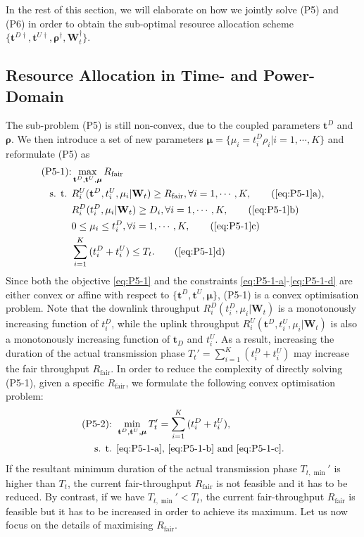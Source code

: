 \documentclass[12pt,draft,onecolumn,journal]{IEEEtran}
\begin{document}
In the rest of this section, we will elaborate on how we jointly solve (P5) and (P6) in order to obtain the sub-optimal resource allocation scheme $\{\mathbf{t}^{D\dagger}, \mathbf{t}^{U\dagger}, \boldsymbol{\rho}^\dagger, \mathbf{W}_t^\dagger\}$.


\subsection{Resource Allocation in Time- and Power-Domain}

The sub-problem (P5) is still non-convex, due to the coupled parameters $\mathbf{t}^D$ and $\boldsymbol{\rho}$. We then introduce a set of new parameters $\mathbf{\mu} = \{\mu_i = t_i^D\rho_i | i=1,\cdots,K\}$ and reformulate (P5) as
\begin{align}
	\text{(P5-1):} & \max_{\mathbf{t}^D, \mathbf{t}^U, \boldsymbol{\mu}} R_{\text{fair}} \label{eq:P5-1} \\
	\text{s. t. } & R_i^U(\mathbf{t}^D,t_i^U,\mu_i | \mathbf{W}_t) \geq R_{\text{fair}}, \forall i = 1,\cdots,K, \tag{\ref{eq:P5-1}a}, \label{eq:P5-1-a}\\
	& R_i^D(t_i^D,\mu_i | \mathbf{W}_t) \geq D_i, \forall i=1,\cdots,K, \tag{\ref{eq:P5-1}b} \label{eq:P5-1-b} \\
	& 0 \leq \mu_i \leq t_i^D, \forall i=1,\cdots,K, \tag{\ref{eq:P5-1}c} \label{eq:P5-1-c} \\
	& \sum_{i=1}^{K}{(t_i^D+t_i^U)}\leq T_t. \tag{\ref{eq:P5-1}d} \label{eq:P5-1-d}
\end{align}
Since both the objective \eqref{eq:P5-1} and the constraints \eqref{eq:P5-1-a}-\eqref{eq:P5-1-d} are either convex or affine with respect to $\{\mathbf{t}^D, \mathbf{t}^U, \boldsymbol{\mu}\}$, (P5-1) is a convex optimisation problem. Note that the downlink throughput $R_i^D(t_i^D,\mu_i | \mathbf{W}_t)$ is a monotonously increasing function of $t_i^D$, while the uplink throughput $R_i^U(\mathbf{t}^D,t_i^U,\mu_i | \mathbf{W}_t)$ is also a monotonously increasing function of $\mathbf{t}_D$ and $t_i^U$. As a result, increasing the duration of the actual transmission phase $T_t' = \sum_{i=1}^{K}{(t_i^D+t_i^U)}$ may increase the fair throughput $R_{\text{fair}}$. In order to reduce the complexity of directly solving (P5-1), given a specific $R_{\text{fair}}$, we formulate the following convex optimisation problem:
\begin{align}
	\text{(P5-2): } &\min_{\mathbf{t}^D, \mathbf{t}^U, \boldsymbol{\mu}} T_t' = \sum_{i=1}^{K}{(t_i^D+t_i^U)}, \label{eq:P5-2} \\
	\text{s. t. } & \text{\eqref{eq:P5-1-a}, \eqref{eq:P5-1-b} and \eqref{eq:P5-1-c}}. \nonumber
\end{align}
If the resultant minimum duration of the actual transmission phase $T_{t,\min}'$ is higher than $T_t$, the current fair-throughput $R_{\text{fair}}$ is not feasible and it has to be reduced. By contrast, if we have $T_{t,\min}' < T_t$, the current fair-throughput $R_{\text{fair}}$ is feasible but it has to be increased in order to achieve its maximum. Let us now focus on the details of maximising $R_{\text{fair}}$.
\end{document}
